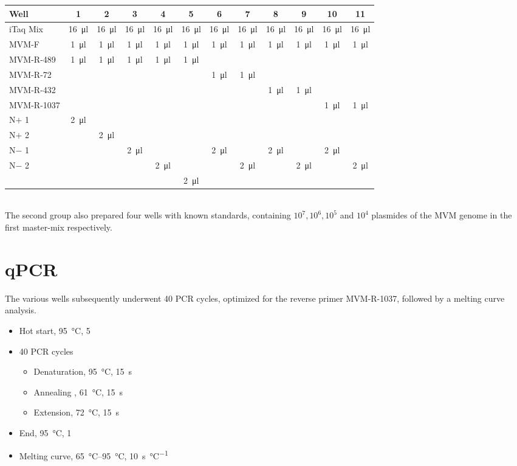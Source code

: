 \documentclass[a4paper,english]{scrreprt}
\begin{document}
\begin{tabu}{lccccccccccc}
	\toprule
	Well & 1 & 2 & 3 & 4 & 5 & 6 & 7 & 8 & 9 & 10 & 11 \\
	\midrule 
	iTaq Mix & \SI{16}{\ul} & \SI{16}{\ul} & \SI{16}{\ul} & \SI{16}{\ul} & \SI{16}{\ul} & \SI{16}{\ul} & \SI{16}{\ul} & \SI{16}{\ul} & \SI{16}{\ul} & \SI{16}{\ul} & \SI{16}{\ul} \\
	MVM-F & \SI{1}{\ul} & \SI{1}{\ul} & \SI{1}{\ul} & \SI{1}{\ul} & \SI{1}{\ul} & \SI{1}{\ul} & \SI{1}{\ul} & \SI{1}{\ul} & \SI{1}{\ul} & \SI{1}{\ul} & \SI{1}{\ul} \\
	MVM-R-489 & \SI{1}{\ul} & \SI{1}{\ul} & \SI{1}{\ul} & \SI{1}{\ul} & \SI{1}{\ul} &  &  &  &  &  &  \\
	MVM-R-72 & & & & & & \SI{1}{\ul} & \SI{1}{\ul} & & & & \\
	MVM-R-432 & & & & & & & & \SI{1}{\ul} & \SI{1}{\ul} & & \\
	MVM-R-1037 & & & & & & & & & & \SI{1}{\ul} & \SI{1}{\ul} \\
	N$+$ 1 & \SI{2}{\ul} & & & & & & & & & & \\
	N$+$ 2 & & \SI{2}{\ul} & & & & & & & & & \\
	N$-$ 1 & & & \SI{2}{\ul} & & & \SI{2}{\ul} & & \SI{2}{\ul} & & \SI{2}{\ul} & \\
	N$-$ 2 & & & & \SI{2}{\ul} & & & \SI{2}{\ul} & & \SI{2}{\ul} & & \SI{2}{\ul} \\
	 & & & & & \SI{2}{\ul} & & & & & & \\
	\bottomrule
\end{tabu}
\\

The second group also prepared four wells with known standards, containing
$10^7, 10^6, 10^5$ and $10^4$ plasmides of the MVM genome in the first
master-mix respectively.

\section{qPCR}

The various wells subsequently underwent 40 PCR cycles, optimized for the
reverse primer MVM-R-1037, followed by a melting curve analysis.

\begin{itemize}
	\item Hot start, \SI{95}{\celsius}, \SI{5}{\min}
	\item 40 PCR cycles
		\begin{itemize}
			\item Denaturation, \SI{95}{\celsius}, \SI{15}{\s}
			\item Annealing , \SI{61}{\celsius}, \SI{15}{\s}
			\item Extension, \SI{72}{\celsius}, \SI{15}{\s}
		\end{itemize}
	\item End, \SI{95}{\celsius}, \SI{1}{\min}
	\item Melting curve, \SIrange{65}{95}{\celsius}, \SI{10}{\s \per \celsius}
\end{itemize}
\end{document}
